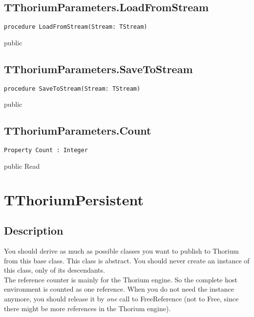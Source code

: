 \subsection{TThoriumParameters.LoadFromStream}
\label{thoriumcore:thorium:tthoriumparameters:loadfromstream}
\begin{FPCList}
\Synopsis
\Declaration 

\begin{verbatim}
procedure LoadFromStream(Stream: TStream)
\end{verbatim}
\Visibility
public
\Description
\Errors
\end{FPCList}
\subsection{TThoriumParameters.SaveToStream}
\label{thoriumcore:thorium:tthoriumparameters:savetostream}
\begin{FPCList}
\Synopsis
\Declaration 

\begin{verbatim}
procedure SaveToStream(Stream: TStream)
\end{verbatim}
\Visibility
public
\Description
\Errors
\end{FPCList}
\subsection{TThoriumParameters.Count}
\label{thoriumcore:thorium:tthoriumparameters:count}
\begin{FPCList}
\Synopsis
\Declaration 

\begin{verbatim}
Property Count : Integer
\end{verbatim}
\Visibility
public
\Access
Read
\Description
\end{FPCList}
\section{TThoriumPersistent}
\label{thoriumcore:thorium:tthoriumpersistent}
\subsection{Description}
You should derive as much as possible classes you want to publish to  Thorium from this base class. This class is abstract. You should never create an instance of this class, only of its descendants.\\
 The reference counter is mainly for the Thorium engine. So the complete host environment is counted as one reference. When you do not need the instance anymore, you should release it by \textit{one} call to FreeReference (not to Free, since there might be more references in the Thorium engine). %
